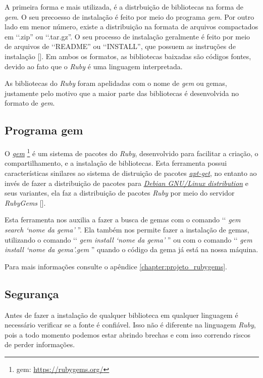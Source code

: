 A primeira forma e mais utilizada, é a distrbuição de bibliotecas na forma de \emph{gem}. O seu precoesso
de instalação é feito por meio do programa \emph{gem}. Por outro lado em menor número, existe a
distribuição na formata de arquivos compactados em ‘‘.zip'' ou ‘‘.tar.gz''. O seu processo de instalação
geralmente é feito por meio de arquivos de ‘‘README'' ou ‘‘INSTALL'', que possuem as instruções de
instalação []. Em ambos os formatos, as bibliotecas baixadas são códigos fontes,
devido ao fato que o \emph{Ruby} é uma linguagem interpretada.

As bibliotecas do \emph{Ruby} foram apelidadas com o nome de \emph{gem} ou gemas, justamente pelo
motivo que a maior parte das bibliotecas é desenvolvida no formato de \emph{gem}.


\subsection{Programa gem}
\label{subsection:programa_gem}

O \emph{\href{https://rubygems.org/}{gem}} \footnote{gem: \url{https://rubygems.org/}} é um sistema
de pacotes do \emph{Ruby}, desenvolvido para facilitar a criação, o compartilhamento, e a instalação de
bibliotecas. Esta ferramenta possui características sinilares ao sistema de distruição de pacotes
\emph{\href{https://packages.qa.debian.org/a/apt.html}{apt-get}}, no entanto ao invés de fazer a distribuição
de pacotes para \emph{\href{https://www.debian.org/}{Debian GNU/Linux distribution}} e seus variantes, ela faz
a distribuição de pacotes \emph{Ruby} por meio do servidor \emph{RubyGems} [].

Esta ferramenta nos auxilia a fazer a busca de gemas com o comando
‘‘ \emph{gem search ‘nome da gema' }''. Ela também nos permite fazer a instalação de
gemas, utilizando o comando ‘‘ \emph{gem install ‘nome da gema' }'' ou com o comando
‘‘ \emph{gem install ‘nome da gema'.gem }'' quando o código da gema já está na nossa máquina.

Para mais informações consulte o apêndice \ref{chapter:projeto_rubygems}.


\subsection{Segurança}
\label{subsection:segurança_biblioteca_ruby}

Antes de fazer a instalação de qualquer biblioteca em qualquer linguagem é necessário verificar
se a fonte é confiável. Isso não é diferente na linguagem \emph{Ruby}, pois a todo momento podemos
estar abrindo brechas e com isso correndo riscos de perder informações.

